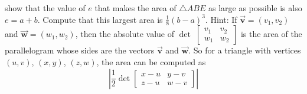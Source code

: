 \documentclass[letterpaper, 12pt]{amsart}
\newcommand{\bvec}[1]{{\vec{\mathbf{#1}}}}
\theoremstyle{definition}  %
\begin{document}
		show that the value of $e$ that makes the area of $\triangle ABE$ as large as possible is also $e = a+b$. 
		Compute that this largest area is $\frac{1}{8}(b - a)^{3}$.
		Hint: If $\bvec{v} =(v_{1}, v_{2})$ and $\bvec{w} = (w_{1}, w_{2})$, then the absolute value of $\det 􏰃\begin{bmatrix} v_{1} & v_{2} \\ w_{1} & w_{2}	\end{bmatrix}$ is the area of the parallelogram whose sides are the vectors $\bvec{v}$ and $\bvec{w}$.
		So for a triangle with vertices $(u, v)$, $(x, y)$, $(z, w)$, the area can be computed as $$\left| \frac{1}{2} \det \begin{bmatrix} x - u & y - v \\ z - u & w - v \end{bmatrix} \right|$$
\end{document}
